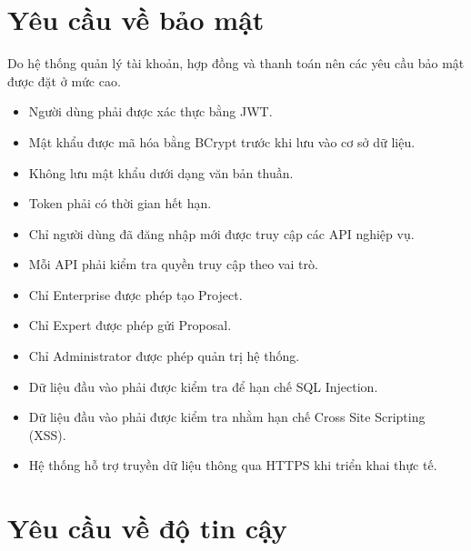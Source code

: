 
\section{Yêu cầu về bảo mật}

Do hệ thống quản lý tài khoản, hợp đồng và thanh toán nên các yêu cầu bảo mật
được đặt ở mức cao.

\begin{itemize}

\item Người dùng phải được xác thực bằng JWT.

\item Mật khẩu được mã hóa bằng BCrypt trước khi lưu vào cơ sở dữ liệu.

\item Không lưu mật khẩu dưới dạng văn bản thuần.

\item Token phải có thời gian hết hạn.

\item Chỉ người dùng đã đăng nhập mới được truy cập các API nghiệp vụ.

\item Mỗi API phải kiểm tra quyền truy cập theo vai trò.

\item Chỉ Enterprise được phép tạo Project.

\item Chỉ Expert được phép gửi Proposal.

\item Chỉ Administrator được phép quản trị hệ thống.

\item Dữ liệu đầu vào phải được kiểm tra để hạn chế SQL Injection.

\item Dữ liệu đầu vào phải được kiểm tra nhằm hạn chế Cross Site Scripting (XSS).

\item Hệ thống hỗ trợ truyền dữ liệu thông qua HTTPS khi triển khai thực tế.

\end{itemize}


\section{Yêu cầu về độ tin cậy}

